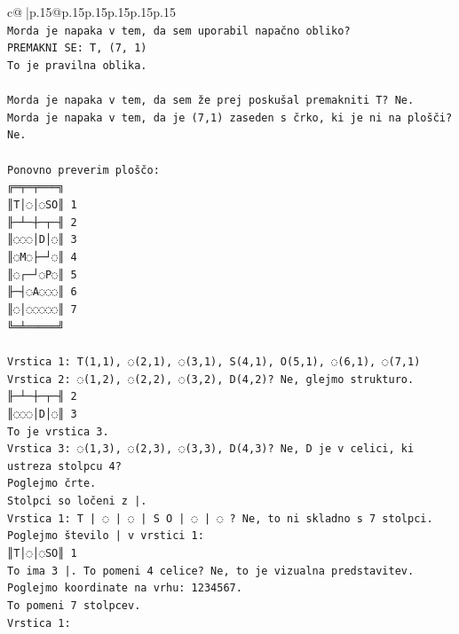 \documentclass{article}
\begin{document}
{\begin{supertabular}{c@{$\;$}|p{.15\linewidth}@{}p{.15\linewidth}p{.15\linewidth}p{.15\linewidth}p{.15\linewidth}p{.15\linewidth}}
{{{\\ 
\texttt{Morda je napaka v tem, da sem uporabil napačno obliko?} \\
\texttt{PREMAKNI SE: T, (7, 1)} \\
\texttt{To je pravilna oblika.} \\
\\ 
\texttt{Morda je napaka v tem, da sem že prej poskušal premakniti T? Ne.} \\
\texttt{Morda je napaka v tem, da je (7,1) zaseden s črko, ki je ni na plošči? Ne.} \\
\\ 
\texttt{Ponovno preverim ploščo:} \\
\texttt{╔═╤═╤═══╗} \\
\texttt{║T│◌│◌SO║ 1} \\
\texttt{╟─┴─┼─┬─╢ 2} \\
\texttt{║◌◌◌│D│◌║ 3} \\
\texttt{║◌M◌├─┘◌║ 4} \\
\texttt{║◌┌─┘◌P◌║ 5} \\
\texttt{╟─┤◌A◌◌◌║ 6} \\
\texttt{║◌│◌◌◌◌◌║ 7} \\
\texttt{╚═╧═════╝} \\
\\ 
\texttt{Vrstica 1: T(1,1), ◌(2,1), ◌(3,1), S(4,1), O(5,1), ◌(6,1), ◌(7,1)} \\
\texttt{Vrstica 2: ◌(1,2), ◌(2,2), ◌(3,2), D(4,2)? Ne, glejmo strukturo.} \\
\texttt{╟─┴─┼─┬─╢ 2} \\
\texttt{║◌◌◌│D│◌║ 3} \\
\texttt{To je vrstica 3.} \\
\texttt{Vrstica 3: ◌(1,3), ◌(2,3), ◌(3,3), D(4,3)? Ne, D je v celici, ki ustreza stolpcu 4?} \\
\texttt{Poglejmo črte.} \\
\texttt{Stolpci so ločeni z |.} \\
\texttt{Vrstica 1: T | ◌ | ◌ | S O | ◌ | ◌ ? Ne, to ni skladno s 7 stolpci.} \\
\texttt{Poglejmo število | v vrstici 1:} \\
\texttt{║T│◌│◌SO║ 1} \\
\texttt{To ima 3 |. To pomeni 4 celice? Ne, to je vizualna predstavitev.} \\
\texttt{Poglejmo koordinate na vrhu: 1234567.} \\
\texttt{To pomeni 7 stolpcev.} \\
\texttt{Vrstica 1:} \\
}}}
\end{supertabular}}
\end{document}

